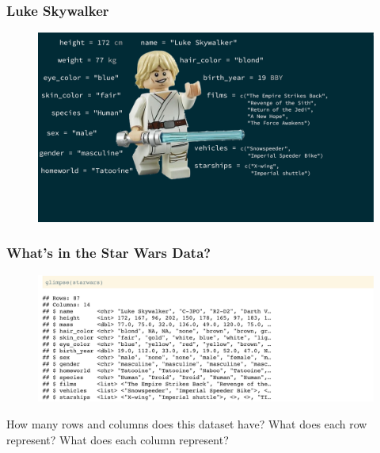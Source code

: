 \documentclass[11pt]{beamer}
\begin{document}
	
	\begin{frame}

		\frametitle{\textbf{Luke Skywalker}}
		
\begin{figure}
	\centering
	\includegraphics[width=0.8\linewidth]{Images/S2/luke-skywalker}

\end{figure}
	
	\end{frame}
	
	
	
	\begin{frame}
		
		\frametitle{\textbf{What's in the Star Wars Data?}}
		
		\begin{figure}
			\centering
			\includegraphics[width=1\linewidth]{Images/S2/code/s2}
			
		\end{figure}
		\small{How many rows and columns does this dataset have? What does each row represent? What does each column represent?}
		
		
	\end{frame}
	
	
	
\end{document}
